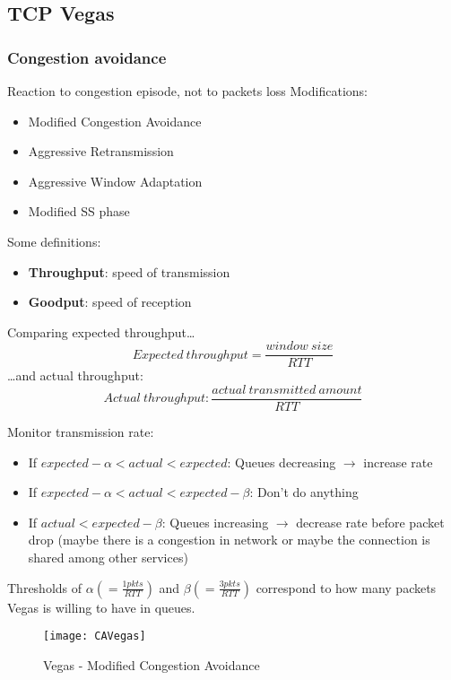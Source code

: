 \subsection{TCP Vegas}

\subsubsection{Congestion avoidance}

Reaction to congestion episode, not to packets loss
Modifications:
\begin{itemize}
  \item Modified Congestion Avoidance
  \item Aggressive Retransmission
  \item Aggressive Window Adaptation
  \item Modified SS phase
\end{itemize}

Some definitions:
\begin{itemize}
  \item \textbf{Throughput}: speed of transmission
  \item \textbf{Goodput}: speed of reception
\end{itemize}

\noindent Comparing expected throughput\dots
\begin{equation*}
Expected\ throughput = \frac{window\ size}{RTT}
\end{equation*}
\dots and actual throughput:
\begin{equation*}
Actual\ throughput: \frac{actual\ transmitted\ amount}{RTT}
\end{equation*}

\noindent Monitor transmission rate:
\begin{itemize}
\item If $expected - \alpha < actual < expected$: Queues decreasing
  $\rightarrow$ increase rate
\item If $expected - \alpha < actual < expected - \beta$: Don’t do anything
\item If $actual < expected - \beta$: Queues increasing $\rightarrow$ decrease
  rate before packet drop (maybe there is a congestion in network or maybe the
  connection is shared among other services) 
\end{itemize}

Thresholds of $\alpha (= \frac{1 pkts}{RTT})$ and
$\beta (= \frac{3 pkts}{RTT})$ correspond to how many packets Vegas is willing
to have in queues.
\begin{figure}[t]
  \centering
  \texttt{[image: CAVegas]}
  \caption{Vegas - Modified Congestion Avoidance}
  \label{fig:tcpVegas:mca}
\end{figure}




